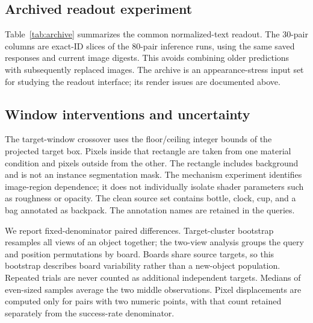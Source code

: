 \subsection{Archived readout experiment}
\label{app:archive}
Table~\ref{tab:archive} summarizes the common normalized-text readout. The
30-pair columns are exact-ID slices of the 80-pair inference runs, using the
same saved responses and current image digests. This avoids combining older
predictions with subsequently replaced images. The archive is an
appearance-stress input set for studying the readout interface; its render
issues are documented above.

\begin{table}[h]
\centering\small
\setlength{\tabcolsep}{3pt}

\caption{Archived raster readout: end-to-end point hits (\%), Original then
Converted within each pair of columns. $\Delta$ and flips refer to the 80-pair
pool. All queries remain in the denominator.}
\label{tab:archive}
\end{table}

\begin{table}[htbp]
\centering\small
\setlength{\tabcolsep}{3pt}

\caption{Full readout matrix. $V$ is the number of valid numeric points over all
30 queries; $H$ is end-to-end point-hit rate. A valid numeric point can still be
out of frame or outside the target. The two-line normalized-text rows are
exact-ID subsets of current 80-pair runs; other rows use their recorded 30-pair
inference runs.}
\label{tab:protocol-full}
\end{table}

\subsection{Window interventions and uncertainty}
The target-window crossover uses the floor/ceiling integer bounds of the
projected target box. Pixels inside that rectangle are taken from one material
condition and pixels outside from the other. The rectangle includes background
and is not an instance segmentation mask. The mechanism experiment identifies
image-region dependence; it does not individually isolate shader parameters
such as roughness or opacity. The clean source set contains bottle, clock,
cup, and a bag annotated as backpack. The annotation names are retained in the
queries. 

We report fixed-denominator paired differences. Target-cluster bootstrap
resamples all views of an object together; the two-view analysis groups the
query and position permutations by board. Boards share source targets, so this
bootstrap describes board variability rather than a new-object population.
Repeated trials are never counted as additional independent targets. Medians
of even-sized samples average the two middle observations. Pixel displacements
are computed only for pairs with two numeric points, with that count retained
separately from the success-rate denominator.

